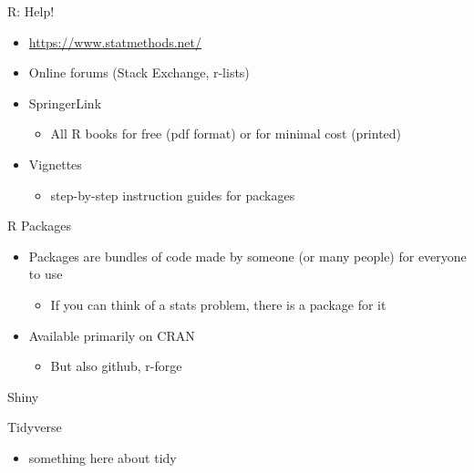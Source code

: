 \documentclass[
  ignorenonframetext,
]{beamer}
\providecommand{\tightlist}{%
  \setlength{\itemsep}{0pt}\setlength{\parskip}{0pt}}
\begin{document}
\begin{frame}{R: Help!}
\protect\hypertarget{r-help}{}

\begin{itemize}
\tightlist
\item
  \url{https://www.statmethods.net/}
\item
  Online forums (Stack Exchange, r-lists)
\item
  SpringerLink

  \begin{itemize}
  \tightlist
  \item
    All R books for free (pdf format) or for minimal cost (printed)
  \end{itemize}
\item
  Vignettes

  \begin{itemize}
  \tightlist
  \item
    step-by-step instruction guides for packages
  \end{itemize}
\end{itemize}

\end{frame}

\begin{frame}{R Packages}
\protect\hypertarget{r-packages}{}

\begin{itemize}
\tightlist
\item
  Packages are bundles of code made by someone (or many people) for
  everyone to use

  \begin{itemize}
  \tightlist
  \item
    If you can think of a stats problem, there is a package for it
  \end{itemize}
\item
  Available primarily on CRAN

  \begin{itemize}
  \tightlist
  \item
    But also github, r-forge
  \end{itemize}
\end{itemize}

\end{frame}

\begin{frame}{Shiny}
\protect\hypertarget{shiny}{}

\end{frame}

\begin{frame}{Tidyverse}
\protect\hypertarget{tidyverse}{}

\begin{itemize}
\tightlist
\item
  something here about tidy
\end{itemize}

\end{frame}
\end{document}
